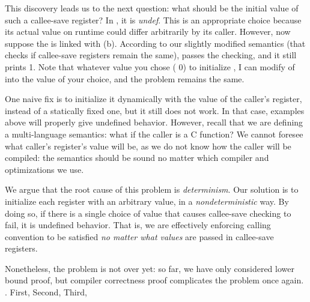 {This discovery leads us to the next question: what should be the initial value of such a callee-save register?
In \ccc{}, it is \textit{undef}.
This is an appropriate choice because its actual value on runtime could differ arbitrarily by its caller. %
However, now suppose the  is linked with (b).
According to our slightly modified semantics (that checks if callee-save registers remain the same),  passes the checking, and it still prints 1.
Note that whatever value you chose (\eg{} 0) to initialize , I can modify  of  into the value of your choice, and the problem remains the same.

One naive fix is to initialize it dynamically with the value of the caller's register, instead of a statically fixed one, but it still does not work.
In that case, examples above will properly give undefined behavior.
However, recall that we are defining a multi-language semantics: what if the caller is a C function?
We cannot foresee what caller's register's value will be, as we do not know how the caller will be compiled: the semantics should be sound no matter which compiler and optimizations we use.

We argue that the root cause of this problem is \textit{determinism}.
Our solution is to initialize each register with an arbitrary value, in a \textit{nondeterministic} way.
By doing so, if there is a single choice of value that causes callee-save checking to fail, it is undefined behavior.
That is, we are effectively enforcing calling convention to be satisfied \textit{no matter what values} are passed in callee-save registers.





Nonetheless, the problem is not over yet: so far, we have only considered lower bound proof, but compiler correctness proof complicates the problem once again.
.
First, 
Second, 
Third, 

}

